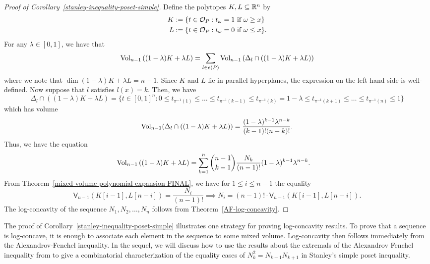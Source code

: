 \documentclass{puthesis-UG}
\begin{document}
\begin{proof}[Proof of Corollary~\ref{stanley-inequality-poset-simple}]
	Define the polytopes $K, L \subseteq \mathbb{R}^{n}$ by 
	\begin{align*}
		K & := \{t \in \mathcal{O}_P : t_\omega = 1 \text{ if } \omega \geq x\} \\
		L & := \{t \in \mathcal{O}_P : t_\omega = 0 \text{ if } \omega \leq x\}.
	\end{align*}
	For any $\lambda \in [0, 1]$, we have that 
	\[
		\operatorname{Vol}_{n-1} \left ( (1 - \lambda) K + \lambda L \right ) = \sum_{l \in e(P)}  \operatorname{Vol}_{n-1} \left ( \Delta_l \cap \left((1-\lambda) K + \lambda L\right) \right )
	\]
	where we note that $\dim (1 - \lambda)K + \lambda L = n-1$. Since $K$ and $L$ lie in parallel hyperplanes, the expression on the left hand side is well-defined. Now suppose that $l$ satisfies $l(x) = k$. Then, we have 
	\[
		\Delta_l \cap ((1 - \lambda) K + \lambda L) = \{t \in [0, 1]^n : 0 \leq t_{\pi^{-1}(1)} \leq \ldots \leq t_{\pi^{-1}(k-1)} \leq t_{\pi^{-1}(k)} = 1-\lambda \leq t_{\pi^{-1}(k+1)} \leq \ldots \leq t_{\pi^{-1}(n)} \leq 1\}
	\]
	which has volume 
	\[
		\operatorname{Vol}_{n-1} (\Delta_l \cap \left((1 - \lambda) K + \lambda L\right)) = \frac{(1-\lambda)^{k-1} \lambda^{n-k}}{(k-1)! (n-k)!}.
	\]
	Thus, we have the equation 
	\begin{align*}
		\operatorname{Vol}_{n-1}\left((1-\lambda) K + \lambda L\right) & = \sum_{k = 1}^n \binom{n-1}{k-1} \frac{N_k}{(n-1)!} (1-\lambda)^{k-1} \lambda^{n-k}.
	\end{align*}
	From Theorem~\ref{mixed-volume-polynomial-expansion-FINAL}, we have for $1 \leq i \leq n-1$ the equality
	\[
		\mathsf{V}_{n-1} (K[i-1], L[n-i]) = \frac{N_i}{(n-1)!} \implies N_i = (n-1)! \cdot \mathsf{V}_{n-1} (K[i-1], L[n-i]).
	\]
	The log-concavity of the sequence $N_1, N_2, \ldots, N_n$ follows from Theorem~\ref{AF-log-concavity}. 
\end{proof}

The proof of Corollary~\ref{stanley-inequality-poset-simple} illustrates one strategy for proving log-concavity results. To prove that a sequence is log-concave, it is enough to associate each element in the sequence to some mixed volume. Log-concavity then follows immediately from the Alexandrov-Fenchel inequality. In the sequel, we will discuss how to use the results about the extremals of the Alexandrov Fenchel inequality from \cite{shenfeld2022extremals} to give a combinatorial characterization of the equality cases of $N_k^2 = N_{k-1} N_{k+1}$ in Stanley's simple poset inequality. 
\end{document}
